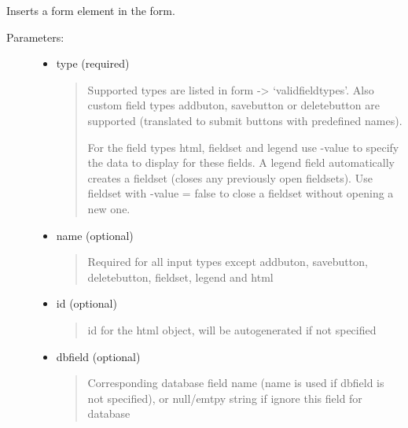 \documentclass[letterpaper,10pt,english]{sphinxmanual}
\begin{document}
\begin{fulllineitems}

\begin{fulllineitems}
Inserts a form element in the form.
\begin{description}
\item[{Parameters:}] \leavevmode\begin{itemize}
\item {} 
type (required)
\begin{quote}

Supported types are listed in form -\textgreater{} `validfieldtypes'. Also
custom field types addbuton, savebutton or deletebutton are
supported (translated to submit buttons with predefined names).

For the field types html, fieldset and legend use -value to specify
the data to display for these fields. A legend field automatically
creates a fieldset (closes any previously open fieldsets). Use
fieldset with -value = false to close a fieldset without opening a
new one.
\end{quote}

\item {} 
name (optional)
\begin{quote}

Required for all input types except addbuton, savebutton,
deletebutton, fieldset, legend and html
\end{quote}

\item {} 
id (optional)
\begin{quote}

id for the html object, will be autogenerated if not specified
\end{quote}

\item {} 
dbfield (optional)
\begin{quote}

Corresponding database field name (name is used if dbfield is not
specified), or null/emtpy string if ignore this field for database
\end{quote}


\end{itemize}
\end{description}
\end{fulllineitems}
\end{fulllineitems}
\end{document}
